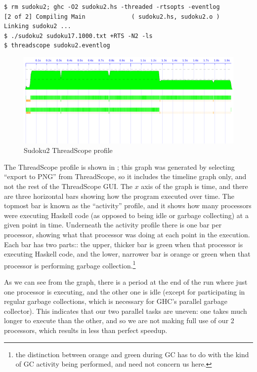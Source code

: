 {\small \begin{verbatim}
$ rm sudoku2; ghc -O2 sudoku2.hs -threaded -rtsopts -eventlog
[2 of 2] Compiling Main             ( sudoku2.hs, sudoku2.o )
Linking sudoku2 ...
$ ./sudoku2 sudoku17.1000.txt +RTS -N2 -ls
$ threadscope sudoku2.eventlog
\end{verbatim}}

\begin{figure}
\begin{center}
\includegraphics[scale=0.34]{sudoku2.png}
\end{center}
\caption{Sudoku2 ThreadScope profile}
\label{fig:sudoku2-threadscope}
\end{figure}

The ThreadScope profile is shown in ; this
graph was generated by selecting ``export to PNG'' from ThreadScope,
so it includes the timeline graph only, and not the rest of the
ThreadScope GUI.  The $x$ axis of the graph is time, and there are
three horizontal bars showing how the program executed over time.  The
topmost bar is known as the ``activity'' profile, and it shows how
many processors were executing Haskell code (as opposed to being idle
or garbage collecting) at a given point in time.  Underneath the
activity profile there is one bar per processor, showing what that
processor was doing at each point in the execution.  Each bar has two
parts:: the upper, thicker bar is green when that processor is
executing Haskell code, and the lower, narrower bar is orange or green
when that processor is performing garbage collection.\footnote{the
  distinction between orange and green during GC has to do with the
  kind of GC activity being performed, and need not concern us here.}

As we can see from the graph, there is a period at the end of the run
where just one processor is executing, and the other one is idle
(except for participating in regular garbage collections, which is
necessary for GHC's parallel garbage collector).  This indicates that
our two parallel tasks are uneven: one takes much longer to execute
than the other, and so we are not making full use of our 2 processors,
which results in less than perfect speedup.

